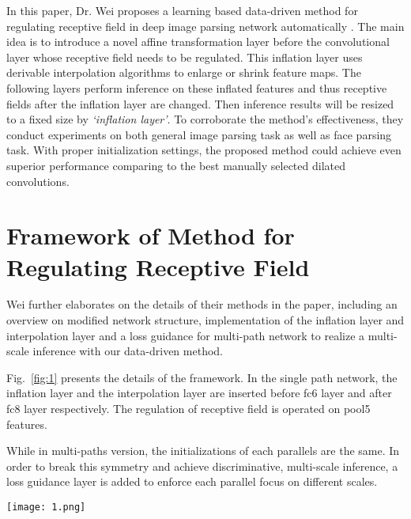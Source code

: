 \documentclass[10pt,twocolumn,letterpaper]{article}
\begin{document}
In this paper, Dr. Wei proposes a learning based data-driven method for regulating receptive field in deep image parsing network automatically \cite{Wei2017Learning}. The main idea is to introduce a novel affine transformation layer before the convolutional layer whose receptive field needs to be regulated. This inflation layer uses derivable interpolation algorithms to enlarge or shrink feature maps. The following layers perform inference on these inflated features and thus receptive fields after the inflation layer are changed. Then inference results will be resized to a fixed size by \emph{`inflation layer'}. To corroborate the method's effectiveness, they conduct experiments on both general image parsing task as well as face parsing task. With proper initialization settings, the proposed method could achieve even superior performance comparing to the best manually selected dilated convolutions.

\section{Framework of Method for Regulating Receptive Field}

Wei further elaborates on the details of their methods in the paper, including an overview on modified network structure, implementation of the inflation layer and interpolation layer and a loss guidance for multi-path network to realize a multi-scale inference with our data-driven method.

Fig.~\ref{fig:1} presents the details of the framework. In the single path network, the inflation layer and the interpolation layer are inserted before fc6 layer and after fc8 layer respectively. The regulation of receptive field is operated on pool5 features.

While in multi-paths version, the initializations of each parallels are the same. In order to break this symmetry and achieve discriminative, multi-scale inference, a loss guidance layer is added to enforce each parallel focus on different scales.

\begin{figure*}
	\begin{center}
		\texttt{[image: 1.png]}
	\end{center}
	\caption{The framework of the method. (a): modified single path network. New layers are inserted before fc6 layer and after fc8 layer. (b): modified multi-paths network where all branches are with the same structure and initialization. \emph{Weighted Gradient Layers} are used to break the symmetry during training. }
	\label{fig:1}
\end{figure*}
\end{document}
